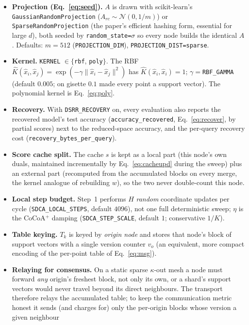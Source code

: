 \documentclass[11pt]{article}
\begin{document}
\begin{itemize}
\item \textbf{Projection (Eq.~\eqref{eq:seed}).} $A$ is drawn with
  scikit-learn's \texttt{GaussianRandomProjection} ($A_{rc}\sim\mathcal N(0,1/m)$) or
  \texttt{SparseRandomProjection} (the paper's efficient hashing form, essential for
  large $d$), both seeded by \texttt{random\_state=}$\sigma$ so every node builds the
  identical $A$. Defaults: $m=512$ (\texttt{PROJECTION\_DIM}),
  \texttt{PROJECTION\_DIST=sparse}.
\item \textbf{Kernel.} \texttt{KERNEL} $\in\{$\texttt{rbf}, \texttt{poly}$\}$. The RBF
  $\hat K(\hat x_i,\hat x_j)=\exp(-\gamma\|\hat x_i-\hat x_j\|^2)$ has
  $\hat K(\hat x_i,\hat x_i)=1$; $\gamma=$\texttt{RBF\_GAMMA} (default $0.005$; on
  gisette $0.1$ made every point a support vector). The polynomial kernel is
  Eq.~\eqref{eq:poly}.
\item \textbf{Recovery.} With \texttt{DSRR\_RECOVERY} on, every evaluation also
  reports the recovered model's test accuracy (\texttt{accuracy\_recovered},
  Eq.~\eqref{eq:recover}, by partial scores) next to the reduced-space accuracy,
  and the per-query recovery cost (\texttt{recovery\_bytes\_per\_query}).
\item \textbf{Score cache split.} The cache $s$ is kept as a local part (this node's
  own duals, maintained incrementally by Eq.~\eqref{eq:cacheupd} during the sweep)
  plus an external part (recomputed from the accumulated blocks on every merge, the
  kernel analogue of rebuilding $w$), so the two never double-count this node.
\item \textbf{Local step budget.} Step~1 performs $H$ \emph{random} coordinate
  updates per cycle (\texttt{SDCA\_LOCAL\_STEPS}, default $4096$), not one full
  deterministic sweep; $\eta$ is the CoCoA$^+$ damping (\texttt{SDCA\_STEP\_SCALE},
  default $1$; conservative $1/K$).
\item \textbf{Table keying.} $T_k$ is keyed by \emph{origin node} and stores that
  node's block of support vectors with a single version counter $v_o$ (an equivalent,
  more compact encoding of the per-point table of Eq.~\eqref{eq:msg}).
\item \textbf{Relaying for consensus.} On a static sparse $\kappa$-out mesh a node
  must forward \emph{any} origin's freshest block, not only its own, or a shard's
  support vectors would never travel beyond its direct neighbours. The transport
  therefore relays the accumulated table; to keep the communication metric honest it
  sends (and charges for) only the per-origin blocks whose version a given neighbour

\end{itemize}
\end{document}

